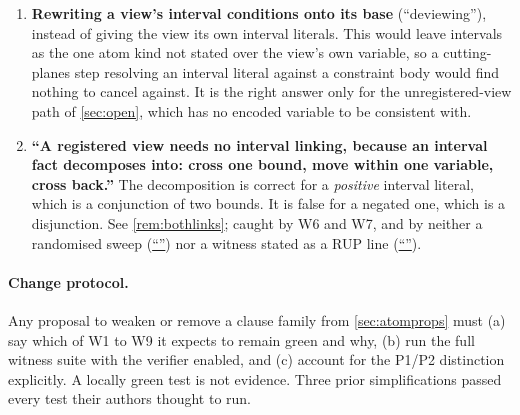 \documentclass[11pt,a4paper]{article}
\theoremstyle{plain}
\theoremstyle{definition}
\theoremstyle{remark}
\newcommand{\nsec}[1]{\hyperref[#1]{``\nameref*{#1}''}}
\begin{document}
\begin{enumerate}[itemsep=3pt]
\item \textbf{Rewriting a view's interval conditions onto its base}
  (``deviewing''), instead of giving the view its own interval literals.  This
  would leave intervals as the one atom kind not stated over the view's own
  variable, so a cutting-planes step resolving an interval literal against
  a constraint body would find nothing to cancel against.  It is the right
  answer only for the unregistered-view path of \cref{sec:open}, which has no
  encoded variable to be consistent with.

\item \textbf{``A registered view needs no interval linking, because an
  interval fact decomposes into: cross one bound, move within one variable,
  cross back.''}  The decomposition is correct for a \emph{positive} interval
  literal, which is a conjunction of two bounds.  It is false for a negated one,
  which is a disjunction.  See \cref{rem:bothlinks}; caught by W6 and W7, and by
  neither a randomised sweep (\nsec{sec:coincidence}) nor a witness stated as a
  RUP line (\nsec{sec:p1p2}).

\end{enumerate}

\paragraph{Change protocol.}  Any proposal to weaken or remove a clause family
from \cref{sec:atomprops} must (a) say which of W1 to W9 it expects to remain
green and why, (b) run the full witness suite with the verifier enabled, and
(c) account for the P1/P2 distinction explicitly.  A locally green test is not
evidence.  Three prior simplifications passed every test their authors thought
to run.
\end{document}

